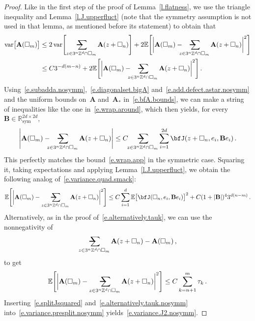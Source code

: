 \documentclass[11pt,twoside]{article} %
\makeatletter
\let\oldsquare\square %
\renewcommand{\square}{\oldsquare}
\numberwithin{equation}{section}
\theoremstyle{definition}
\newcommand*{\R}{\ensuremath{\mathbb{R}}}
\newcommand*{\Zd}{\ensuremath{\mathbb{Z}^d}}
\newcommand{\sym}{\mathrm{sym}}
\newcommand{\cu}{\square}
\newcommand{\E}{\mathbb{E}}
\DeclareMathOperator{\var}{var}
\newcommand{\avsum}{\mathop{\mathpalette\avsuminner\relax}\displaylimits}
\newcommand\avsuminner[2]{%
  {\sbox0{$\m@th#1\sum$}%
   \vphantom{\usebox0}%
   \ooalign{%
     \hidewidth
     \smash{\,\rule[.23em]{8.8pt}{1.1pt} \relax}%
     \hidewidth\cr
   ~$\m@th#1\sum$\cr
   }%
  }%
}
\newcommand{\bfA}{\mathbf{A}}
\makeatother
\begin{document}
\begin{proof}
Like in the first step of the proof of Lemma~\ref{l.flatness}, we use the triangle inequality and Lemma~\ref{l.J.upperfluct} (note that the symmetry assumption is not used in that lemma, as mentioned before its statement) to obtain that 
\begin{align}
\label{e.variance.presplit.nosymm}
\var\bigl [ \bfA(\cu_m) \bigr] 
&
\leq 
2\var \Biggl[ \avsum_{z\in 3^n\Zd\cap\cu_m}
\bfA(z+\cu_n) \Biggr] 
+
2 \E \Biggl[
\biggl| \bfA(\cu_m) - \!\!\!\! \avsum_{z\in 3^n\Zd\cap\cu_m}
\bfA(z+\cu_n) \biggr|^2 \Biggr]
\notag \\ &
\leq
C 3^{-d (m-n)}
+
2 \E \Biggl[
\biggl| \bfA(\cu_m) - \!\!\!\! \avsum_{z\in 3^n\Zd\cap\cu_m}
\bfA(z+\cu_n) \biggr|^2 \Biggr]
\,.
\end{align}
Using~\eqref{e.subadda.nosymm},~\eqref{e.diagonalset.bigA} and~\eqref{e.add.defect.astar.nosymm} and the uniform bounds on~$\bfA$ and~$\bfA_*$ in~\eqref{e.bfA.bounds}, we can make a string of inequalities like the one in~\eqref{e.wrap.around}, which then yields, for every~$\mathbf{B} \in \R^{2d\times 2d}_{\sym}$, 
\begin{equation}
\label{e.wrap.app.nosymm}
\Biggl| \bfA(\cu_m) - \!\!\!\! \avsum_{z\in 3^n\Zd\cap\cu_m}
\bfA(z+\cu_n) \Biggr| 
\leq 
C \!\! \avsum_{z\in 3^n\Zd\cap\cu_m}
\sum_{i=1}^{2d}
\bfJ(z+\cu_n,e_i,\mathbf{B} e_i) 
\,.
\end{equation}
This perfectly matches the bound~\eqref{e.wrap.app} in the symmetric case. 
Squaring it, taking expectations and applying Lemma~\ref{l.J.upperfluct}, we obtain the following analog of~\eqref{e.variance.quad.smack}:
\begin{align}
\label{e.splitJsquared}
\E \Biggl[
\biggl| \bfA(\cu_m) - \avsum_{z\in 3^n\Zd\cap\cu_m}
\bfA(z+\cu_n) \biggr|^2
\Biggr]
\leq
C 
\sum_{i=1}^d
\E \bigl[ \bfJ(\cu_n,e_i,\mathbf{B} e_i) \bigr]^2
+ C(1+|\mathbf{B}|)^4 3^{d(n-m)}
\,.
\end{align}
Alternatively, as in the proof of~\eqref{e.alternatively.tauk}, we can use the nonnegativity of
\begin{equation*}
\avsum_{z\in 3^n\Zd\cap\cu_m}
\bfA(z+\cu_n)
-
\bfA(\cu_m)\,,
\end{equation*}
to get  
\begin{equation}
\label{e.alternatively.tauk.nosymm}
\E \Biggl[
\biggl| \bfA(\cu_m) - \avsum_{z\in 3^n\Zd\cap\cu_m} 
\bfA(z+\cu_n) \biggr|^2
\Biggr]
\leq
C \sum_{k=n+1}^m \tau_k
\,.
\end{equation}
Inserting~\eqref{e.splitJsquared} and~\eqref{e.alternatively.tauk.nosymm} into~\eqref{e.variance.presplit.nosymm} yields~\eqref{e.variance.J2.nosymm}. 
\end{proof}
\end{document}
